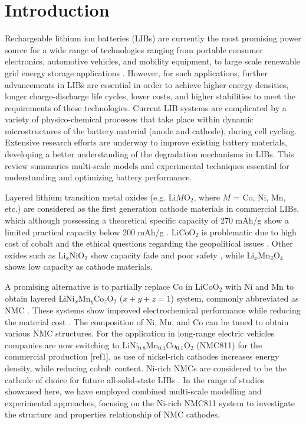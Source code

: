 \documentclass[aps,prb,twocolumn,superscriptaddress,reprint]{revtex4-1}
\begin{document}
\section{Introduction}
Rechargeable lithium ion batteries (LIBs) are currently the most promising power source for a wide range of technologies ranging from portable consumer electronics, automotive vehicles, and mobility equipment, to large scale renewable grid energy storage applications \cite{}.  However, for such applications, further advancements in LIBs are essential in order to achieve higher energy densities, longer charge-discharge life cycles, lower costs, and higher stabilities to meet the requirements of these technologies.  Current LIB systems are complicated by a variety of physico-chemical processes that take place within dynamic microstructures of the battery material (anode and cathode), during cell cycling. 
Extensive research efforts are underway to improve existing battery materials, developing a better understanding of the degradation mechanisms in LIBs. This review summaries multi-scale models and experimental techniques essential for understanding and optimizing battery performance.

Layered lithium transition metal oxides (e.g. Li$M$O$_{2}$, where $M$ = Co, Ni, Mn, etc.) are considered as the first generation cathode materials in commercial LIBs, which although possessing a theoretical specific capacity of 270 mAh/g show a limited practical capacity below 200 mAh/g \cite{Myung2017}. LiCoO$_{2}$ is problematic due to high cost of cobalt and the ethical questions regarding the geopolitical issues \cite{mo_impact_2018}. Other oxides such as Li$_{x}$NiO$_{2}$ show capacity fade and poor safety \cite{min_comparative_2016}, while Li$_{x}$Mn$_{2}$O$_{4}$ shows low capacity \cite{tian_performance_2018} as cathode materials.

A promising alternative is to partially replace Co in LiCoO$_{2}$ with Ni and Mn to obtain layered LiNi$_{x}$Mn$_{y}$Co$_{z}$O$_{2}$ ($x+y+z=1$) system, commonly abbreviated as NMC \cite{rozier_review_2015}. These systems show improved electrochemical performance while reducing the material cost \cite{ohzuku_layered_2001}. The composition of Ni, Mn, and Co can be tuned to obtain various NMC structures. For the application in long-range electric vehicles companies are now switching to LiNi$_{0.8}$Mn$_{0.1}$Co$_{0.1}$O$_{2}$ (NMC811) for the commercial production [ref1]\cite{}, as use of nickel-rich cathodes increases energy density, while reducing cobalt content. Ni-rich NMCs are considered to be the cathode of choice for future all-solid-state LIBs \cite{Myung2017}. In the range of studies showcased here, we have employed combined multi-scale modelling and experimental approaches, focusing on the Ni-rich NMC811 system to investigate the structure and properties relationship of NMC cathodes.
\end{document}
